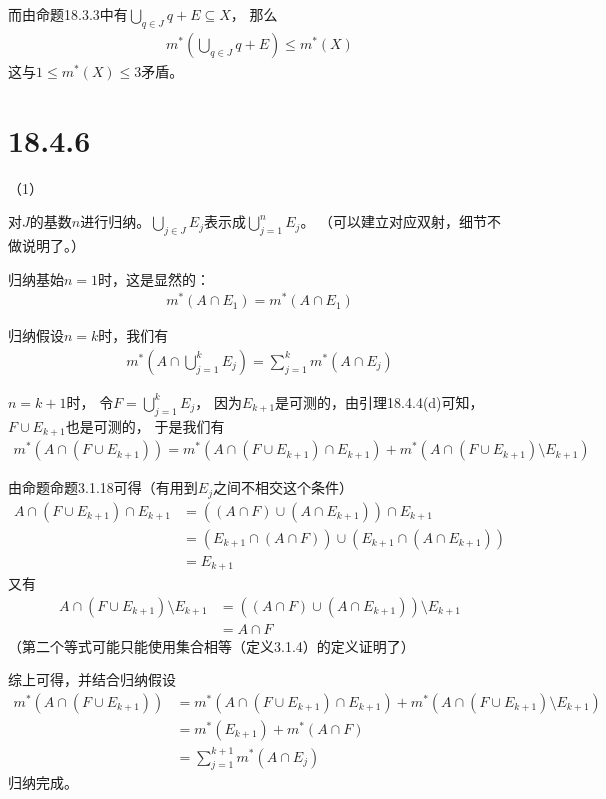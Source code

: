 \documentclass{article}
\begin{document}
而由命题18.3.3中有$\bigcup\limits_{q \in J} q + E \subseteq X$，
那么
\begin{align*}
  m^{\ast}\left(\bigcup\limits_{q \in J} q + E\right) \leq m^{\ast}(X)
\end{align*}
这与$1 \leq m^{\ast}(X) \leq 3$矛盾。

\section*{18.4.6}
（1）

对$J$的基数$n$进行归纳。$\bigcup \limits_{j \in J} E_j$表示成$\bigcup \limits_{j = 1}^n E_j$。
（可以建立对应双射，细节不做说明了。）

归纳基始$n = 1$时，这是显然的：
\begin{align*}
  m^{\ast}(A \cap E_1) = m^{\ast}(A \cap E_1)
\end{align*}

归纳假设$n = k$时，我们有
\begin{align*}
  m^{\ast}(A \cap \bigcup\limits_{j = 1}^k E_j) = \sum \limits_{j = 1}^k m^{\ast}(A \cap E_j)
\end{align*}

$n = k + 1$时，
令$F = \bigcup\limits_{j = 1}^k E_j$，
因为$E_{k + 1}$是可测的，由引理18.4.4(d)可知，$F \cup E_{k + 1}$也是可测的，
于是我们有
\begin{align*}
  m^{\ast}(A \cap (F \cup E_{k + 1}))
  = m^{\ast}(A \cap (F \cup E_{k + 1}) \cap E_{k + 1}) + m^{\ast}(A \cap (F \cup E_{k + 1}) \setminus E_{k + 1})
\end{align*}

由命题命题3.1.18可得（有用到$E_j$之间不相交这个条件）
\begin{align*}
  A \cap (F \cup E_{k + 1}) \cap E_{k + 1}
   & = ((A \cap F) \cup (A \cap E_{k + 1})) \cap E_{k + 1}                  \\
   & = (E_{k + 1} \cap (A \cap F)) \cup (E_{k + 1} \cap (A \cap E_{k + 1})) \\
   & = E_{k + 1}
\end{align*}
又有
\begin{align*}
  A \cap (F \cup E_{k + 1}) \setminus E_{k + 1}
   & = ((A \cap F) \cup (A \cap E_{k + 1})) \setminus E_{k + 1} \\
   & = A \cap F
\end{align*}
（第二个等式可能只能使用集合相等（定义3.1.4）的定义证明了）

综上可得，并结合归纳假设
\begin{align*}
  m^{\ast}(A \cap (F \cup E_{k + 1}))
   & = m^{\ast}(A \cap (F \cup E_{k + 1}) \cap E_{k + 1}) + m^{\ast}(A \cap (F \cup E_{k + 1}) \setminus E_{k + 1}) \\
   & = m^{\ast}(E_{k + 1}) + m^{\ast}(A \cap F)                                                                     \\
   & = \sum\limits_{j = 1}^{k + 1} m^{\ast}(A \cap E_{j})
\end{align*}
归纳完成。
\end{document}

